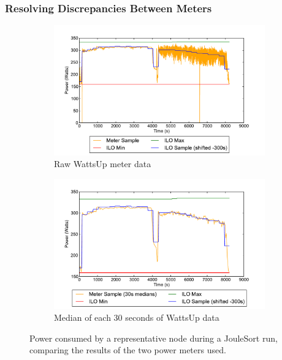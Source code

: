 \subsubsection{Resolving Discrepancies Between Meters}

\begin{figure}
\centering
\begin{subfigure}[b]{\columnwidth}
  \centering
  \includegraphics[width=\columnwidth]{tritonsort/graphs/joulesort_raw.pdf}
  \caption{\label{fig:power:raw} Raw WattsUp meter data}
\end{subfigure}
\begin{subfigure}[b]{\columnwidth}
  \centering
  \includegraphics[width=\columnwidth]{tritonsort/graphs/joulesort_30s.pdf}
  \caption{\label{fig:power:30s} Median of each 30 seconds of WattsUp data}
\end{subfigure}
\caption{\label{fig:power} Power consumed by a representative node during a
  JouleSort run, comparing the results of the two power meters used.}
\end{figure}

